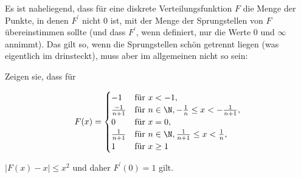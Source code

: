 
\begin{exercise}

Es ist naheliegend, dass für eine diskrete Verteilungsfunktion $F$ die Menge der Punkte, in denen $F^\prime$ nicht $0$ ist, mit der Menge der Sprungstellen von $F$ übereinstimmen sollte (und dass $F^\prime$, wenn definiert, nur die Werte $0$ und $\infty$ annimmt).
Das gilt so, wenn die Sprungstellen schön getrennt liegen (was eigentlich im  drinsteckt), muss aber im allgemeinen nicht so sein:

Zeigen sie, dass für

\begin{align*}
    F(x)
    =
    \begin{cases}
        -1               & \text{für}~ x < -1,                                           \\
        \frac{-1}{n + 1} & \text{für}~ n \in \N, -\frac{1}{n} \leq x < -\frac{1}{n + 1}, \\
        0                & \text{für}~ x = 0,                                            \\
        \frac{1}{n + 1}  & \text{für}~ n \in \N, \frac{1}{n + 1} \leq x < \frac{1}{n},   \\
        1                & \text{für}~ x \geq 1
    \end{cases}
\end{align*}

$|F(x) - x| \leq x^2$ und daher $F^\prime(0) = 1$ gilt.

\end{exercise}


